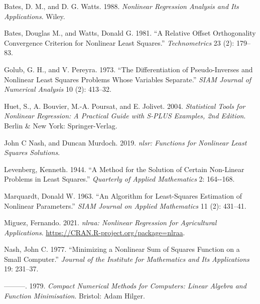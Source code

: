 \hypertarget{refs}{}
\begin{CSLReferences}{1}{0}
\leavevmode{}%
Bates, D. M., and D. G. Watts. 1988. \emph{Nonlinear Regression Analysis and Its Applications}. Wiley.

\leavevmode{}%
Bates, Douglas M., and Watts, Donald G. 1981. {``A Relative Offset Orthogonality Convergence Criterion for Nonlinear Least Squares.''} \emph{Technometrics} 23 (2): 179--83.

\leavevmode{}%
Golub, G. H., and V. Pereyra. 1973. {``The Differentiation of Pseudo-Inverses and Nonlinear Least Squares Problems Whose Variables Separate.''} \emph{SIAM Journal of Numerical Analysis} 10 (2): 413--32.

\leavevmode{}%
Huet, S., A. Bouvier, M.-A. Poursat, and E. Jolivet. 2004. \emph{Statistical Tools for Nonlinear Regression: A Practical Guide with {S-PLUS} Examples, 2nd Edition}. Berlin \& New York: Springer-Verlag.

\leavevmode{}%
John C Nash, and Duncan Murdoch. 2019. \emph{{nlsr: Functions for Nonlinear Least Squares Solutions}}.

\leavevmode{}%
Levenberg, Kenneth. 1944. {``A Method for the Solution of Certain Non-Linear Problems in Least Squares.''} \emph{Quarterly of Applied Mathematics} 2: 164-\/-168.

\leavevmode{}%
Marquardt, Donald W. 1963. {``{An Algorithm for Least-Squares Estimation of Nonlinear Parameters}.''} \emph{SIAM Journal on Applied Mathematics} 11 (2): 431--41.

\leavevmode{}%
Miguez, Fernando. 2021. \emph{{nlraa: Nonlinear Regression for Agricultural Applications}}. \url{https://CRAN.R-project.org/package=nlraa}.

\leavevmode{}%
Nash, John C. 1977. {``Minimizing a Nonlinear Sum of Squares Function on a Small Computer.''} \emph{Journal of the Institute for Mathematics and Its Applications} 19: 231--37.

\leavevmode{}%
---------. 1979. \emph{Compact Numerical Methods for Computers: Linear Algebra and Function Minimisation}. Bristol: Adam Hilger.


\end{CSLReferences}
